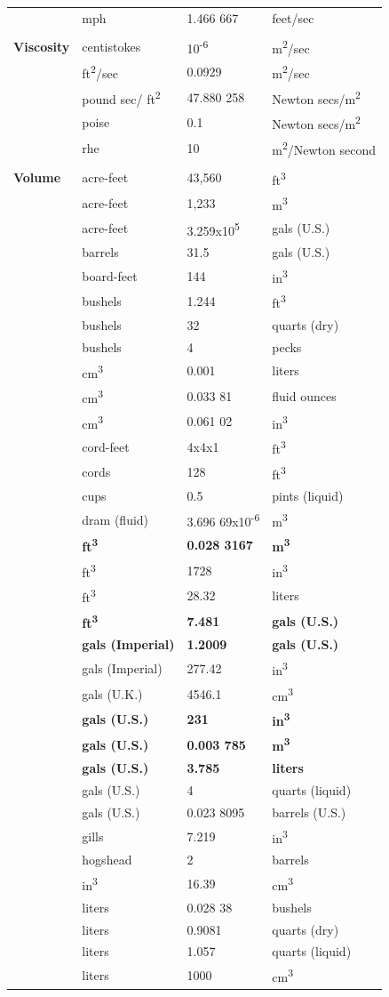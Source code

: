 \documentclass[
]{book}
\begin{document}
\begin{longtable}[]{@{}llll@{}}
& mph & 1.466 667 & feet/sec\tabularnewline
& & &\tabularnewline
\textbf{Viscosity} & centistokes & 10\textsuperscript{-6} & m\textsuperscript{2}/sec\tabularnewline
& ft\textsuperscript{2}/sec & 0.0929 & m\textsuperscript{2}/sec\tabularnewline
& pound sec/ ft\textsuperscript{2} & 47.880 258 & Newton secs/m\textsuperscript{2}\tabularnewline
& poise & 0.1 & Newton secs/m\textsuperscript{2}\tabularnewline
& rhe & 10 & m\textsuperscript{2}/Newton second\tabularnewline
& & &\tabularnewline
\textbf{Volume} & acre-feet & 43,560 & ft\textsuperscript{3}\tabularnewline
& acre-feet & 1,233 & m\textsuperscript{3}\tabularnewline
& acre-feet & 3.259x10\textsuperscript{5} & gals (U.S.)\tabularnewline
& barrels & 31.5 & gals (U.S.)\tabularnewline
& board-feet & 144 & in\textsuperscript{3}\tabularnewline
& bushels & 1.244 & ft\textsuperscript{3}\tabularnewline
& bushels & 32 & quarts (dry)\tabularnewline
& bushels & 4 & pecks\tabularnewline
& cm\textsuperscript{3} & 0.001 & liters\tabularnewline
& cm\textsuperscript{3} & 0.033 81 & fluid ounces\tabularnewline
& cm\textsuperscript{3} & 0.061 02 & in\textsuperscript{3}\tabularnewline
& cord-feet & 4x4x1 & ft\textsuperscript{3}\tabularnewline
& cords & 128 & ft\textsuperscript{3}\tabularnewline
& cups & 0.5 & pints (liquid)\tabularnewline
& dram (fluid) & 3.696 69x10\textsuperscript{-6} & m\textsuperscript{3}\tabularnewline
& \textbf{ft\textsuperscript{3}} & \textbf{0.028 3167} & \textbf{m\textsuperscript{3}}\tabularnewline
& ft\textsuperscript{3} & 1728 & in\textsuperscript{3}\tabularnewline
& ft\textsuperscript{3} & 28.32 & liters\tabularnewline
& \textbf{ft\textsuperscript{3}} & \textbf{7.481} & \textbf{gals (U.S.)}\tabularnewline
& \textbf{gals (Imperial)} & \textbf{1.2009} & \textbf{gals (U.S.)}\tabularnewline
& gals (Imperial) & 277.42 & in\textsuperscript{3}\tabularnewline
& gals (U.K.) & 4546.1 & cm\textsuperscript{3}\tabularnewline
& \textbf{gals (U.S.)} & \textbf{231} & \textbf{in\textsuperscript{3}}\tabularnewline
& \textbf{gals (U.S.)} & \textbf{0.003 785} & \textbf{m\textsuperscript{3}}\tabularnewline
& \textbf{gals (U.S.)} & \textbf{3.785} & \textbf{liters}\tabularnewline
& gals (U.S.) & 4 & quarts (liquid)\tabularnewline
& gals (U.S.) & 0.023 8095 & barrels (U.S.)\tabularnewline
& gills & 7.219 & in\textsuperscript{3}\tabularnewline
& hogshead & 2 & barrels\tabularnewline
& in\textsuperscript{3} & 16.39 & cm\textsuperscript{3}\tabularnewline
& liters & 0.028 38 & bushels\tabularnewline
& liters & 0.9081 & quarts (dry)\tabularnewline
& liters & 1.057 & quarts (liquid)\tabularnewline
& liters & 1000 & cm\textsuperscript{3}\tabularnewline

\end{longtable}
\end{document}
